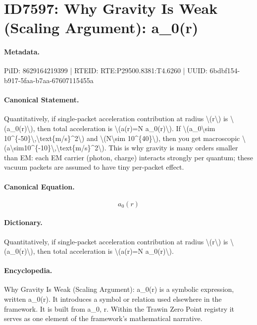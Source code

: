 \section*{ID7597: Why Gravity Is Weak (Scaling Argument): a\_0(r)}
\paragraph{Metadata.}
PiID: 8629164219399 | RTEID: RTE:P29500.8381:T4.6260 | UUID: 6bdbf154-b917-5faa-b7aa-67607115455a

\paragraph{Canonical Statement.}
Quantitatively, if single-packet acceleration contribution at radius \textbackslash{}(r\textbackslash{}) is \textbackslash{}(a\_0(r)\textbackslash{}), then total acceleration is \textbackslash{}(a(r)=N a\_0(r)\textbackslash{}). If \textbackslash{}(a\_0\textbackslash{}sim 10\textasciicircum{}\{-50\}\textbackslash{},\textbackslash{}text\{m/s\}\textasciicircum{}2\textbackslash{}) and \textbackslash{}(N\textbackslash{}sim 10\textasciicircum{}\{40\}\textbackslash{}), then you get macroscopic \textbackslash{}(a\textbackslash{}sim10\textasciicircum{}\{-10\}\textbackslash{},\textbackslash{}text\{m/s\}\textasciicircum{}2\textbackslash{}). This is why gravity is many orders smaller than EM: each EM carrier (photon, charge) interacts strongly per quantum; these vacuum packets are assumed to have tiny per-packet effect.

\paragraph{Canonical Equation.}
\[
a_0(r)
\]

\paragraph{Dictionary.}
Quantitatively, if single-packet acceleration contribution at radius \textbackslash{}(r\textbackslash{}) is \textbackslash{}(a\_0(r)\textbackslash{}), then total acceleration is \textbackslash{}(a(r)=N a\_0(r)\textbackslash{}).

\paragraph{Encyclopedia.}
Why Gravity Is Weak (Scaling Argument): a\_0(r) is a symbolic expression, written a\_0(r). It introduces a symbol or relation used elsewhere in the framework. It is built from a\_0, r. Within the Trawin Zero Point registry it serves as one element of the framework's mathematical narrative.
